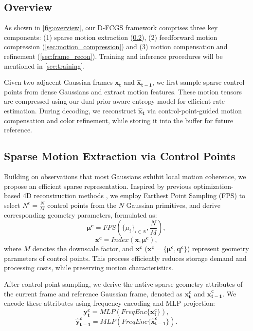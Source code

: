 \documentclass[letterpaper]{article} %
\begin{document}
\subsection{Overview}

As shown in \cref{fig:overview}, our D-FCGS framework comprises three key components: (1) sparse motion extraction (\cref{sec:motion_extraction}), (2) feedforward motion compression (\cref{sec:motion_compression}) and (3) motion compensation and refinement (\cref{sec:frame_recon}). Training and inference procedures will be mentioned in \cref{sec:training}.

Given two adjacent Gaussian frames $\boldsymbol{x_t}$ and $\boldsymbol{\hat{x}_{t-1}}$, we first sample sparse control points from dense Gaussians and extract motion features. These motion tensors are compressed using our dual prior-aware entropy model for efficient rate estimation. During decoding, we reconstruct $\boldsymbol{\hat{x}_t}$ via control-point-guided motion compensation and color refinement, while storing  it into the buffer for future reference.

\subsection{Sparse Motion Extraction via Control Points}
\label{sec:motion_extraction}
Building on observations that most Gaussians exhibit local motion coherence, we propose an efficient sparse representation. Inspired by previous optimization-based 4D reconstruction methods \cite{he2024s4d, yan2025instant, huang2024sc}, we employ Farthest Point Sampling (FPS) to select $N^c = \frac{N}{M}$ control points from the $N$ Gaussian primitives, and derive corresponding geometry parameters, formulated as:
\begin{equation}
    \boldsymbol{\mu^c} = FPS(\{\mu_i\}_{i\in N}, \frac{N}{M}),
\end{equation}
\begin{equation}
    \boldsymbol{x^{c}} = Index(\boldsymbol{x}, \boldsymbol{\mu^c}),
\end{equation}
where $M$ denotes the downscale factor, and $\boldsymbol{x^{c}}$  ($\boldsymbol{x^c} = \{\boldsymbol{\mu^c}, \boldsymbol{q^c}\}$) represent geometry parameters of control points. This process efficiently reduces storage demand and processing costs, while preserving motion characteristics.


After control point sampling, we derive the native sparse geometry attributes of the current frame and reference Gaussian frame, denoted as $\boldsymbol{x^c_t}$ and $\boldsymbol{\hat{x}^c_{t-1}}$. We encode these attributes using frequency encoding \cite{mildenhall2021nerf} and MLP projection:
\begin{equation}
    \boldsymbol{y^c_{t}} = MLP(FreqEnc\{\boldsymbol{x^c_t}\}),
\end{equation}
\begin{equation}
    \boldsymbol{\hat{y}^c_{t-1}} = MLP(FreqEnc\{\boldsymbol{\hat{x}^c_{t-1}}\}).
\end{equation}
\end{document}
